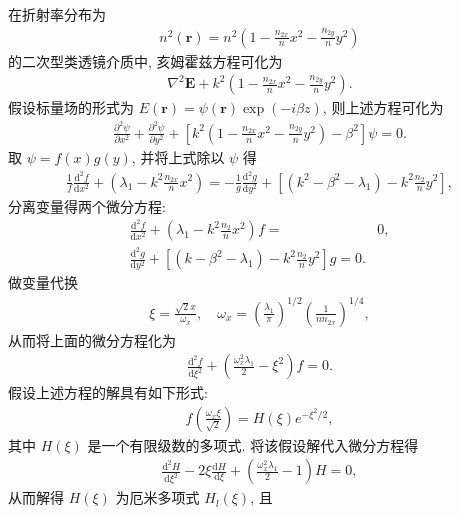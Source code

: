 \documentclass{note}
\begin{document}
\begin{pf}
    在折射率分布为
    \begin{align}
        n^2(\bm{r})=n^2\left(1-\frac{n_{2x}}{n}x^2-\frac{n_{2y}}{n}y^2\right)
    \end{align}
    的二次型类透镜介质中, 亥姆霍兹方程可化为
    \begin{align}
        \nabla^2\bm{E}+k^2\left(1-\frac{n_{2x}}{n}x^2-\frac{n_{2y}}{n}y^2\right).
    \end{align}
    假设标量场的形式为 $E(\bm{r})=\psi(\bm{r})\exp(-i\beta z)$, 则上述方程可化为
    \begin{align}
        \frac{\partial^2\psi}{\partial x^2}+\frac{\partial^2\psi}{\partial y^2}+\left[k^2\left(1-\frac{n_{2x}}{n}x^2-\frac{n_{2y}}{n}y^2\right)-\beta^2\right]\psi=0.
    \end{align}
    取 $\psi=f(x)g(y)$, 并将上式除以 $\psi$ 得
    \begin{align}
        \frac{1}{f}\frac{\mathrm{d}^2f}{\mathrm{d}x^2}+\left(\lambda_1-k^2\frac{n_{2x}}{n}x^2\right)=-\frac{1}{g}\frac{\mathrm{d}^2g}{\mathrm{d}y^2}+\left[(k^2-\beta^2-\lambda_1)-k^2\frac{n_2}{n}y^2\right],
    \end{align}
    分离变量得两个微分方程:
    \begin{align}
        \frac{\mathrm{d}^2f}{\mathrm{d}x^2}+\left(\lambda_1-k^2\frac{n_2}{n}x^2\right)f=&0,\\
        \frac{\mathrm{d}^2g}{\mathrm{d}y^2}+\left[(k-\beta^2-\lambda_1)-k^2\frac{n_2}{n}y^2\right]g=0.
    \end{align}
    做变量代换
    \begin{align}
        \xi=\frac{\sqrt{2}x}{\omega_x},\quad\omega_x=\left(\frac{\lambda_1}{\pi}\right)^{1/2}\left(\frac{1}{nn_{2x}}\right)^{1/4},
    \end{align}
    从而将上面的微分方程化为
    \begin{align}
        \frac{\mathrm{d}^2f}{\mathrm{d}\xi^2}+\left(\frac{\omega_x^2\lambda_1}{2}-\xi^2\right)f=0.
    \end{align}
    假设上述方程的解具有如下形式:
    \begin{align}
        f\left(\frac{\omega_x\xi}{\sqrt{2}}\right)=H(\xi)e^{-\xi^2/2},
    \end{align}
    其中 $H(\xi)$ 是一个有限级数的多项式. 将该假设解代入微分方程得
    \begin{align}
        \frac{\mathrm{d}^2H}{\mathrm{d}\xi^2}-2\xi\frac{\mathrm{d}H}{\mathrm{d}\xi}+\left(\frac{\omega_x^2\lambda_1}{2}-1\right)H=0,
    \end{align}
    从而解得 $H(\xi)$ 为厄米多项式 $H_l(\xi)$, 且

\end{pf}
\end{document}
